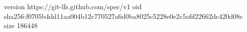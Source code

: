 version https://git-lfs.github.com/spec/v1
oid sha256:f0705b4dd11aa004b12c770527a6d0ba8025c5228e0e2c5a6f22662dc420d08c
size 186448
